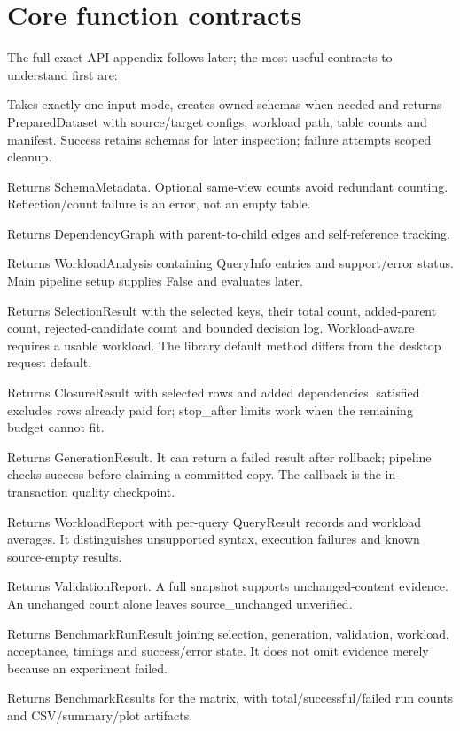 \documentclass[11pt,a4paper,oneside]{report}
\begin{document}
\section{Core function contracts}
The full exact API appendix follows later; the most useful contracts to understand first are:
\begin{description}[style=nextline,leftmargin=1.5em,labelindent=0pt]
\item[\texttt{prepare\_dataset()}] Takes exactly one input mode, creates owned schemas when needed and returns PreparedDataset with source/target configs, workload path, table counts and manifest. Success retains schemas for later inspection; failure attempts scoped cleanup.
\item[\texttt{inspect\_schema()}] Returns SchemaMetadata. Optional same-view counts avoid redundant counting. Reflection/count failure is an error, not an empty table.
\item[\texttt{build\_dependency\_graph()}] Returns DependencyGraph with parent-to-child edges and self-reference tracking.
\item[\texttt{analyze\_workload()}] Returns WorkloadAnalysis containing QueryInfo entries and support/error status. Main pipeline setup supplies False and evaluates later.
\item[\texttt{select\_rows()}] Returns SelectionResult with the selected keys, their total count, added-parent count, rejected-candidate count and bounded decision log. Workload-aware requires a usable workload. The library default method differs from the desktop request default.
\item[\texttt{compute\_closure()}] Returns ClosureResult with selected rows and added dependencies. satisfied excludes rows already paid for; stop\_after limits work when the remaining budget cannot fit.
\item[\texttt{materialize\_subset()}] Returns GenerationResult. It can return a failed result after rollback; pipeline checks success before claiming a committed copy. The callback is the in-transaction quality checkpoint.
\item[\texttt{evaluate\_workload()}] Returns WorkloadReport with per-query QueryResult records and workload averages. It distinguishes unsupported syntax, execution failures and known source-empty results.
\item[\texttt{validate\_subset()}] Returns ValidationReport. A full snapshot supports unchanged-content evidence. An unchanged count alone leaves source\_unchanged unverified.
\item[\texttt{run\_pipeline()}] Returns BenchmarkRunResult joining selection, generation, validation, workload, acceptance, timings and success/error state. It does not omit evidence merely because an experiment failed.
\item[\texttt{run\_benchmark()}] Returns BenchmarkResults for the matrix, with total/successful/failed run counts and CSV/summary/plot artifacts.
\end{description}
\end{document}
